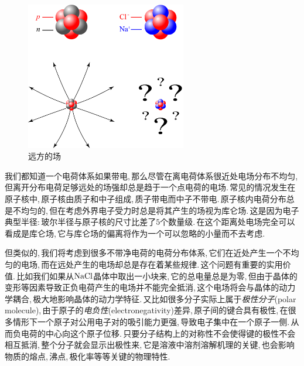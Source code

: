 \begin{figure}
\centering
\vspace{-2cm}
\includegraphics[width=7cm]{image/7-1-10.png}
\caption{远方的场}
\end{figure}
我们都知道一个电荷体系如果带电,\,那么尽管在离电荷体系很近处电场分布不均匀,\,但离开分布电荷足够远处的场强却总是趋于一个点电荷的电场.\,常见的情况发生在原子核中,\,原子核由质子和中子组成,\,质子带电而中子不带电.\,原子核内电荷分布总是不均匀的,\,但在考虑外界电子受力时总是将其产生的场视为库仑场.\,这是因为电子典型半径:\,玻尔半径与原子核的尺寸比差了$5$个数量级.\,在这个距离处电场完全可以看成是库仑场,\,它与库仑场的偏离将作为一个可以忽略的小量而不去考虑.

但类似的,\,我们将考虑到很多不带净电荷的电荷分布体系,\,它们在近处产生一个不均匀的电场,\,而在远处产生的电场却总是存在着某些规律.\,这个问题有重要的实用价值.\,比如我们如果从${\rm NaCl}$晶体中取出一小块来,\,它的总电量总是为零,\,但由于晶体的变形等因素导致正负电荷产生的电场并不能完全抵消,\,这个电场将会与晶体的动力学耦合,\,极大地影响晶体的动力学特征.\,又比如很多分子实际上属于\emph{极性分子}(polar molecule),\,由于原子的\emph{电负性}(electronegativity)差异,\,原子间的键合具有极性,\,在很多情形下一个原子对公用电子对的吸引能力更强,\,导致电子集中在一个原子一侧.\,从而负电荷的中心向这个原子位移.\,只要分子结构上的对称性不会使得键的极性不会相互抵消,\,整个分子就会显示出极性来,\,它是溶液中溶剂溶解机理的关键,\,也会影响物质的熔点,\,沸点,\,极化率等等关键的物理特性.

